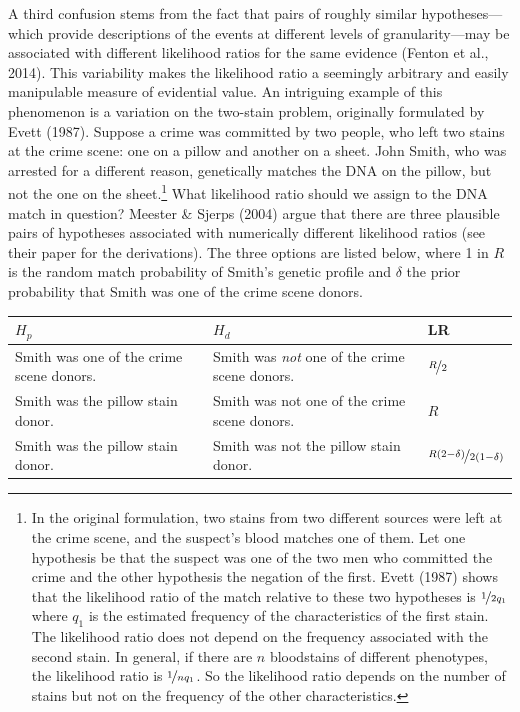 \documentclass[
  letterpaper,
  DIV=11,
  numbers=noendperiod]{scrartcl}
\begin{document}
A third confusion stems from the fact that pairs of roughly similar
hypotheses---which provide descriptions of the events at different
levels of granularity---may be associated with different likelihood
ratios for the same evidence (Fenton et al., 2014). This variability
makes the likelihood ratio a seemingly arbitrary and easily manipulable
measure of evidential value. An intriguing example of this phenomenon is
a variation on the two-stain problem, originally formulated by Evett
(1987). Suppose a crime was committed by two people, who left two stains
at the crime scene: one on a pillow and another on a sheet. John Smith,
who was arrested for a different reason, genetically matches the DNA on
the pillow, but not the one on the sheet.\footnote{In the original
  formulation, two stains from two different sources were left at the
  crime scene, and the suspect's blood matches one of them. Let one
  hypothesis be that the suspect was one of the two men who committed
  the crime and the other hypothesis the negation of the first. Evett
  (1987) shows that the likelihood ratio of the match relative to these
  two hypotheses is \(\nicefrac{1}{2q_1}\) where \(q_1\) is the
  estimated frequency of the characteristics of the first stain. The
  likelihood ratio does not depend on the frequency associated with the
  second stain. In general, if there are \(n\) bloodstains of different
  phenotypes, the likelihood ratio is \(\nicefrac{1}{nq_1}\). So the
  likelihood ratio depends on the number of stains but not on the
  frequency of the other characteristics.} What likelihood ratio should
we assign to the DNA match in question? Meester \& Sjerps (2004) argue
that there are three plausible pairs of hypotheses associated with
numerically different likelihood ratios (see their paper for the
derivations). The three options are listed below, where 1 in \(R\) is
the random match probability of Smith's genetic profile and \(\delta\)
the prior probability that Smith was one of the crime scene donors.
\vspace{2mm}

\begin{center}
    \footnotesize
    \begin{tabular}{@{}p{5cm}p{5cm}l@{}}
        \toprule
        $H_p$ & $H_d$  & LR \\ \midrule
        Smith was one of the crime scene donors.   &  Smith was \textit{not} one of the crime scene donors. & $\nicefrac{R}{2}$   \\
        Smith was the pillow stain donor.     & Smith was not one of the crime scene donors.& $R$\\
        Smith was the pillow stain donor. & Smith was not the pillow stain donor. &  $\nicefrac{R(2-\delta)}{2(1-\delta)}$
        \\ \bottomrule
    \end{tabular}
\end{center}
\normalsize
\vspace{2mm}
\end{document}
